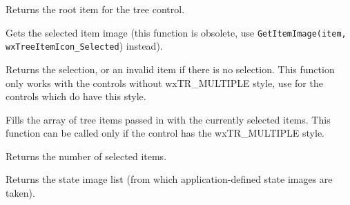 


\label{wxtreectrlgetrootitem}


Returns the root item for the tree control.


\label{wxtreectrlgetitemselectedimage}


Gets the selected item image (this function is obsolete, use
{\tt GetItemImage(item, wxTreeItemIcon\_Selected}) instead).


\label{wxtreectrlgetselection}


Returns the selection, or an invalid item if there is no selection.
This function only works with the controls without wxTR\_MULTIPLE style, use
 for the controls which do have
this style.


\label{wxtreectrlgetselections}


Fills the array of tree items passed in with the currently selected items. This
function can be called only if the control has the wxTR\_MULTIPLE style.

Returns the number of selected items.




\label{wxtreectrlgetstateimagelist}


Returns the state image list (from which application-defined state images are taken).


\label{wxtreectrlhittest}


